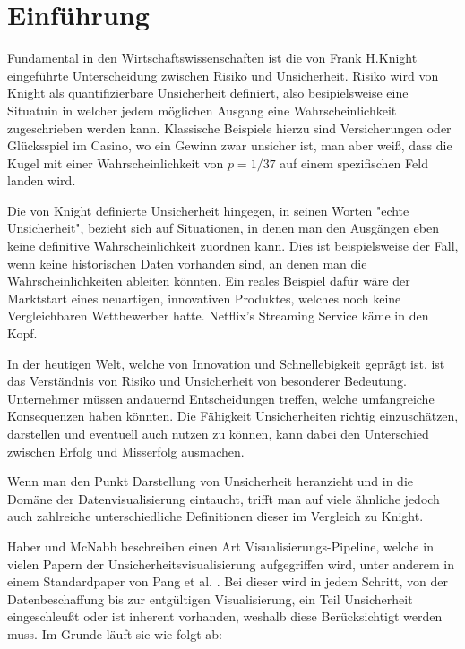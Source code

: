 \section{Einführung}

Fundamental in den Wirtschaftswissenschaften ist die von Frank H.Knight eingeführte Unterscheidung zwischen Risiko und Unsicherheit. Risiko wird von Knight als quantifizierbare 
Unsicherheit definiert, also besipielsweise eine Situatuin in welcher jedem möglichen Ausgang eine Wahrscheinlichkeit zugeschrieben werden kann. Klassische Beispiele hierzu sind 
Versicherungen oder Glücksspiel im Casino, wo ein Gewinn zwar unsicher ist, man aber weiß, dass die Kugel mit einer Wahrscheinlichkeit von $p = 1/37$ auf einem spezifischen Feld 
landen wird.

Die von Knight definierte Unsicherheit hingegen, in seinen Worten "echte Unsicherheit", bezieht sich auf Situationen, in denen man den Ausgängen eben keine definitive Wahrscheinlichkeit zuordnen kann.
Dies ist beispielsweise der Fall, wenn keine historischen Daten vorhanden sind, an denen man die Wahrscheinlichkeiten ableiten könnten. \cite{Knight1921} Ein reales Beispiel dafür wäre der Marktstart eines neuartigen, innovativen Produktes, 
welches noch keine Vergleichbaren Wettbewerber hatte. Netflix's Streaming Service käme in den Kopf. 

In der heutigen Welt, welche von Innovation und Schnellebigkeit geprägt ist, ist das Verständnis von Risiko und Unsicherheit von besonderer Bedeutung. Unternehmer müssen andauernd Entscheidungen treffen, welche umfangreiche Konsequenzen haben könnten. 
Die Fähigkeit Unsicherheiten richtig einzuschätzen, darstellen und eventuell auch nutzen zu können, kann dabei den Unterschied zwischen Erfolg und Misserfolg ausmachen. 

Wenn man den Punkt Darstellung von Unsicherheit heranzieht und in die Domäne der Datenvisualisierung eintaucht, trifft man auf viele ähnliche jedoch auch zahlreiche unterschiedliche Definitionen dieser 
im Vergleich zu Knight. 

Haber und McNabb \cite{Haber1990} beschreiben einen Art Visualisierungs-Pipeline, welche in vielen Papern der Unsicherheitsvisualisierung aufgegriffen wird, unter anderem in einem Standardpaper von Pang et al. \cite{Pang1997}.
Bei dieser wird in jedem Schritt, von der Datenbeschaffung bis zur entgültigen Visualisierung, ein Teil Unsicherheit eingeschleußt oder ist inherent vorhanden, weshalb diese Berücksichtigt werden muss. Im Grunde läuft sie wie folgt ab:

